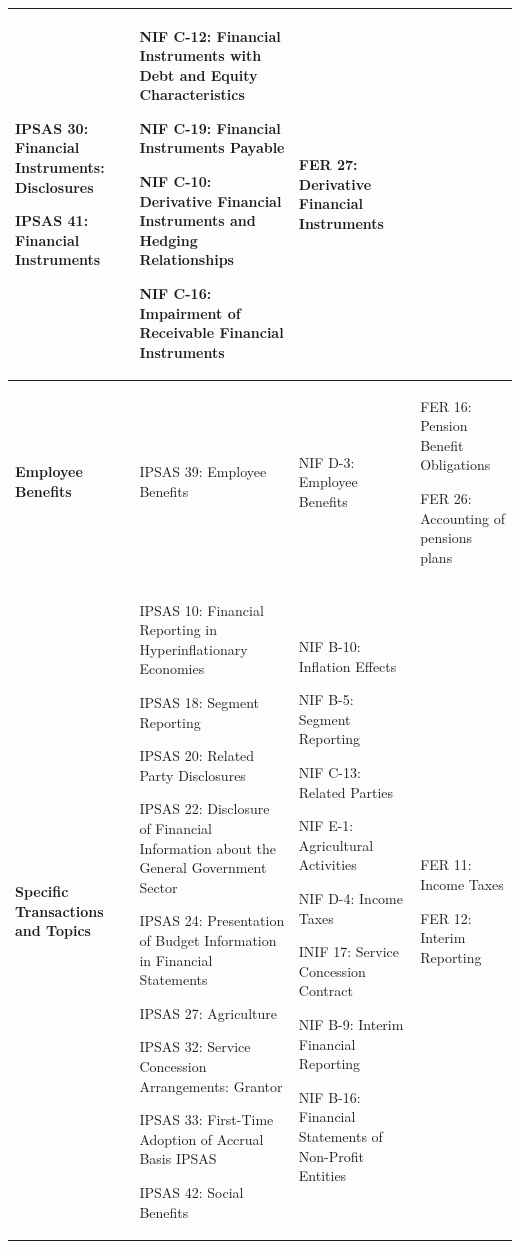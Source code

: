 \documentclass[10pt]{article}
\begin{document}
\begin{center}
\begin{longtable}{|>{\raggedright\arraybackslash}p{2.5cm}|>{\raggedright\arraybackslash}p{5cm}|>{\raggedright\arraybackslash}p{4cm}|>{\raggedright\arraybackslash}p{3cm}|}
IPSAS 30: Financial Instruments: Disclosures

IPSAS 41: Financial Instruments

 & NIF C-12: Financial Instruments with Debt and Equity Characteristics

NIF C-19: Financial Instruments Payable

NIF C-10: Derivative Financial Instruments and Hedging Relationships

NIF C-16: Impairment of Receivable Financial Instruments

 & FER 27: Derivative Financial Instruments \\
\hline
\textbf{Employee Benefits}

 & IPSAS 39: Employee Benefits

 & NIF D-3: Employee Benefits & FER 16: Pension Benefit Obligations

FER 26: Accounting of pensions plans

 \\
\hline
\textbf{Specific Transactions and Topics} & IPSAS 10: Financial Reporting in Hyperinflationary Economies

IPSAS 18: Segment Reporting

IPSAS 20: Related Party Disclosures

IPSAS 22: Disclosure of Financial Information about the General Government Sector

IPSAS 24: Presentation of Budget Information in Financial Statements

IPSAS 27: Agriculture

IPSAS 32: Service Concession Arrangements: Grantor

IPSAS 33: First-Time Adoption of Accrual Basis IPSAS

IPSAS 42: Social Benefits

 & NIF B-10: Inflation Effects

NIF B-5: Segment Reporting

NIF C-13: Related Parties

NIF E-1: Agricultural Activities

NIF D-4: Income Taxes

INIF 17: Service Concession Contract

NIF B-9: Interim Financial Reporting

NIF B-16: Financial Statements of Non-Profit Entities

 & FER 11: Income Taxes

FER 12: Interim Reporting


\end{longtable}
\end{center}
\end{document}
